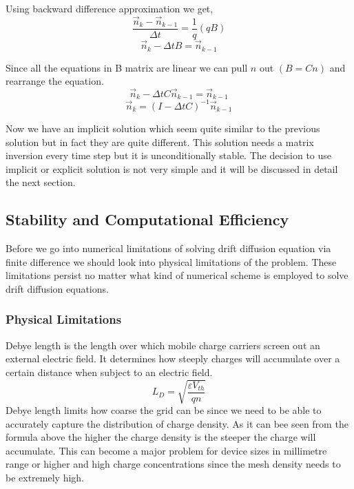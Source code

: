 Using backward difference approximation we get,
\begin{equation}\nonumber
\frac{ \vec{n}_{k}-\vec{n}_{k-1}}{\Delta t}=\frac{1}{q}(qB)
\end{equation}
\begin{equation}\nonumber
\vec{n}_{k}-\Delta t B =\vec{n}_{k-1}
\end{equation}

Since all the equations in B matrix are linear we can pull $n$ out $(B=Cn)$ and rearrange the equation.
\begin{equation}\nonumber
\vec{n}_{k}-\Delta t C\vec{n}_{k-1} =\vec{n}_{k-1}
\end{equation}
\begin{equation}
\vec{n}_k=(I-\Delta t C)^{-1}\vec{n}_{k-1}
\end{equation}

Now we have an implicit solution which seem quite similar to the previous solution but in fact they are quite different. This solution needs a matrix inversion every time step but it is unconditionally stable. The decision to use implicit or explicit solution is not very simple and it will be discussed in detail the next section.
\clearpage
\subsection{Stability and Computational Efficiency}
Before we go into numerical limitations of solving drift diffusion equation via finite difference we should look into physical limitations of the problem. These limitations persist no matter what kind of numerical scheme is employed to solve drift diffusion equations.

\subsubsection{Physical Limitations}
Debye length is the length over which mobile charge carriers screen out an external electric field. It determines how steeply charges will accumulate over a certain distance when subject to an electric field. 
\begin{equation}
L_D=\sqrt{\frac{\varepsilon V_{th}}{q n}}
\label{debye}
\end{equation}
Debye length limits how coarse the grid can be since we need to be able to accurately capture the distribution of charge density. As it can bee seen from the formula above the higher the charge density is the steeper the charge will accumulate. This can become a major problem for device sizes in millimetre range or higher and high charge concentrations since the mesh density needs to be extremely high.

